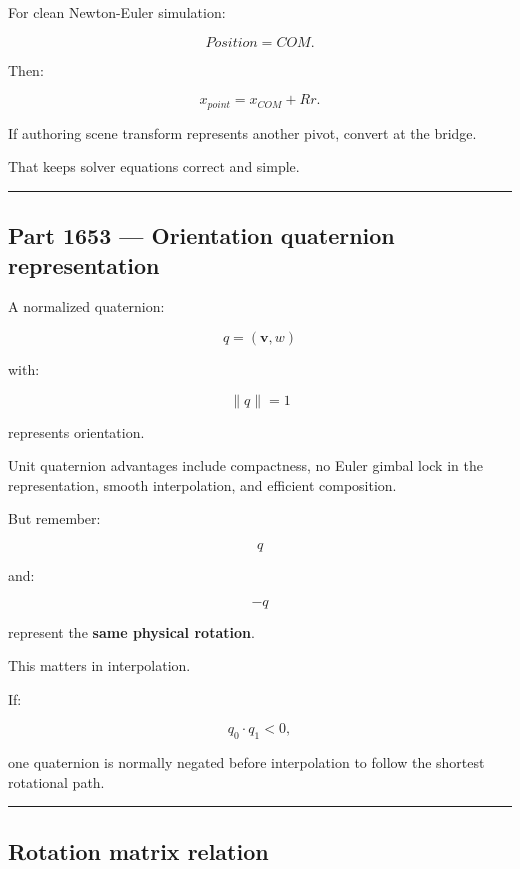 For clean Newton-Euler simulation:

\[
\boxed{
Position=COM.
}
\]

Then:

\[
x_{point}
=
x_{COM}
+
Rr.
\]

If authoring scene transform represents another pivot, convert at the bridge.

That keeps solver equations correct and simple.

\begin{center}\rule{0.5\linewidth}{0.5pt}\end{center}

\subsection{Part 1653 --- Orientation quaternion representation}\label{06-engine-ii-ch037-part-1653-orientation-quaternion-representation}

\hypertarget{06-engine-ii-ch037-part-1653-orientation-quaternion-representation}{}

A normalized quaternion:

\[
q=(\mathbf v,w)
\]

with:

\[
\|q\|=1
\]

represents orientation.

Unit quaternion advantages include compactness, no Euler gimbal lock in the representation, smooth interpolation, and efficient composition.

But remember:

\[
q
\]

and:

\[
-q
\]

represent the \textbf{same physical rotation}.

This matters in interpolation.

If:

\[
q_0\cdot q_1<0,
\]

one quaternion is normally negated before interpolation to follow the shortest rotational path.

\begin{center}\rule{0.5\linewidth}{0.5pt}\end{center}

\subsection{Rotation matrix relation}\label{06-engine-ii-ch037-rotation-matrix-relation}

